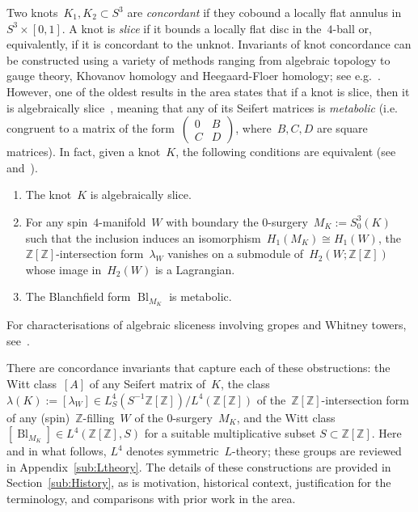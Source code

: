 \documentclass[10.9pt,a4paper]{amsart}
\theoremstyle{definition}
\theoremstyle{remark}
\newcommand{\Z}{\mathbb{Z}}
\newcommand{\C}{\mathbb{C}}
\newcommand{\bsm}{\left(\begin{smallmatrix}}
\newcommand{\esm}{\end{smallmatrix}\right)}
\newcommand{\Bl}{\operatorname{Bl}}
\begin{document}
Two knots~$K_1,K_2 \subset S^3$ are \emph{concordant} if they cobound a locally flat annulus in~$S^3 \times [0,1]$.
A knot is \emph{slice} if it bounds a locally flat disc in the~$4$-ball or,  equivalently,  if it is concordant to the unknot.
Invariants of knot concordance can be constructed using a variety of methods ranging from algebraic topology  to gauge theory, Khovanov homology and Heegaard-Floer homology; see e.g.~\cite{OzsvathSzaboTau,Rasmussen,
KronheimerMrowkaGaugeS,HomSurvey}.
However, one of the oldest results in the area states that if a knot is slice, then it is algebraically slice~\cite{LevineKnotCob}, meaning that any of its Seifert matrices is \emph{metabolic} (i.e. congruent to a matrix of the form~$\bsm 0&B\\C &D\esm$, where~$B,C,D$ are square matrices).
In fact, given a knot~$K$, the following conditions are equivalent (see~\cite[Theorem 1.1]{CochranOrrTeichner} and~\cite{KeartonCobordism}).
\begin{enumerate}
\item The knot~$K$ is algebraically slice.
\item For any spin~$4$-manifold~$W$ with boundary the $0$-surgery~$M_K:=S^3_0(K)$ such that the inclusion induces an isomorphism~$H_1(M_K)\cong H_1(W)$,  the~$\Z[\Z]$-intersection form~$\lambda_W$ vanishes on a submodule of~$H_2(W;\Z[\Z])$ whose image in~$H_2(W)$ is a Lagrangian.
\item The Blanchfield form $\Bl_{M_K}$  is metabolic.
\end{enumerate}
For characterisations 
of algebraic sliceness
 involving gropes and Whitney towers, see~\cite{CochranOrrTeichner}.

There are concordance invariants that capture each of these obstructions:  the Witt class~$[A]$ of any Seifert matrix of~$K$, the class~$\lambda(K):=[\lambda_W] \in L^4_S(S^{-1}\Z[\Z] )/L^4(\Z[\Z] )$ of the~$\Z[\Z]$-intersection form of any (spin)~$\Z$-filling~$W$ of the $0$-surgery~$M_K$,  and the Witt class~$[\Bl_{M_K}] \in L^4(\Z[\Z],S)$ for a suitable multiplicative subset $S \subset \Z[\Z]$.
Here and in what follows,  $L^4$ denotes symmetric~$L$-theory; these  groups are reviewed in Appendix~\ref{sub:Ltheory}. 
The details of these constructions are provided in Section~\ref{sub:History},  as is motivation,  historical context,  justification for the terminology, and comparisons with prior work in the area. 
\end{document}
